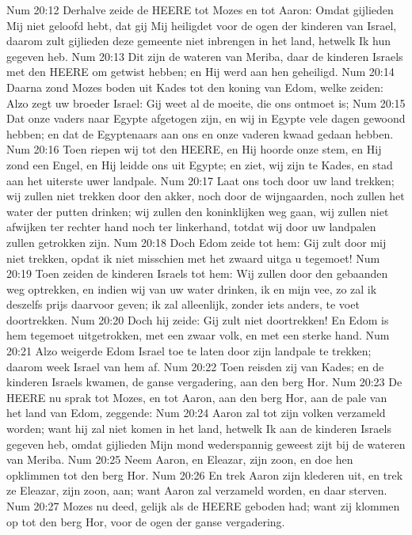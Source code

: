 Num 20:12  Derhalve zeide de HEERE tot Mozes en tot Aaron: Omdat gijlieden Mij niet geloofd hebt, dat gij Mij heiligdet voor de ogen der kinderen van Israel, daarom zult gijlieden deze gemeente niet inbrengen in het land, hetwelk Ik hun gegeven heb.
Num 20:13  Dit zijn de wateren van Meriba, daar de kinderen Israels met den HEERE om getwist hebben; en Hij werd aan hen geheiligd.
Num 20:14  Daarna zond Mozes boden uit Kades tot den koning van Edom, welke zeiden: Alzo zegt uw broeder Israel: Gij weet al de moeite, die ons ontmoet is;
Num 20:15  Dat onze vaders naar Egypte afgetogen zijn, en wij in Egypte vele dagen gewoond hebben; en dat de Egyptenaars aan ons en onze vaderen kwaad gedaan hebben.
Num 20:16  Toen riepen wij tot den HEERE, en Hij hoorde onze stem, en Hij zond een Engel, en Hij leidde ons uit Egypte; en ziet, wij zijn te Kades, en stad aan het uiterste uwer landpale.
Num 20:17  Laat ons toch door uw land trekken; wij zullen niet trekken door den akker, noch door de wijngaarden, noch zullen het water der putten drinken; wij zullen den koninklijken weg gaan, wij zullen niet afwijken ter rechter hand noch ter linkerhand, totdat wij door uw landpalen zullen getrokken zijn.
Num 20:18  Doch Edom zeide tot hem: Gij zult door mij niet trekken, opdat ik niet misschien met het zwaard uitga u tegemoet!
Num 20:19  Toen zeiden de kinderen Israels tot hem: Wij zullen door den gebaanden weg optrekken, en indien wij van uw water drinken, ik en mijn vee, zo zal ik deszelfs prijs daarvoor geven; ik zal alleenlijk, zonder iets anders, te voet doortrekken.
Num 20:20  Doch hij zeide: Gij zult niet doortrekken! En Edom is hem tegemoet uitgetrokken, met een zwaar volk, en met een sterke hand.
Num 20:21  Alzo weigerde Edom Israel toe te laten door zijn landpale te trekken; daarom week Israel van hem af.
Num 20:22  Toen reisden zij van Kades; en de kinderen Israels kwamen, de ganse vergadering, aan den berg Hor.
Num 20:23  De HEERE nu sprak tot Mozes, en tot Aaron, aan den berg Hor, aan de pale van het land van Edom, zeggende:
Num 20:24  Aaron zal tot zijn volken verzameld worden; want hij zal niet komen in het land, hetwelk Ik aan de kinderen Israels gegeven heb, omdat gijlieden Mijn mond wederspannig geweest zijt bij de wateren van Meriba.
Num 20:25  Neem Aaron, en Eleazar, zijn zoon, en doe hen opklimmen tot den berg Hor.
Num 20:26  En trek Aaron zijn klederen uit, en trek ze Eleazar, zijn zoon, aan; want Aaron zal verzameld worden, en daar sterven.
Num 20:27  Mozes nu deed, gelijk als de HEERE geboden had; want zij klommen op tot den berg Hor, voor de ogen der ganse vergadering.
